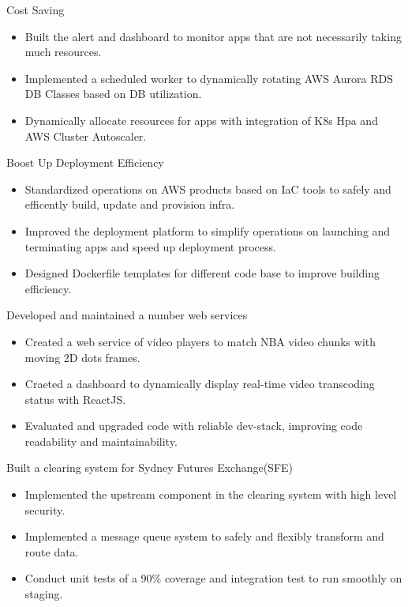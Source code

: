 \documentclass{resume}
\begin{document}
Cost Saving
\begin{itemize}
  \item Built the alert and dashboard to monitor apps that are not necessarily taking much resources.
  \item Implemented a scheduled worker to dynamically rotating AWS Aurora RDS DB Classes based on DB utilization.
  \item Dynamically allocate resources for apps with integration of K8s Hpa and AWS Cluster Autoscaler.
\end{itemize}

Boost Up Deployment Efficiency
\begin{itemize}
  \item Standardized operations on AWS products based on IaC tools to safely and efficently build, update and provision infra.
  \item Improved the deployment platform to simplify operations on launching and terminating apps and speed up deployment process.
  \item Designed Dockerfile templates for different code base to improve building efficiency.
\end{itemize}

Developed and maintained a number web services
\begin{itemize}
  \item Created a web service of video players to match NBA video chunks with moving 2D dots frames.
  \item Craeted a dashboard to dynamically display real-time video transcoding status with ReactJS.
  \item Evaluated and upgraded code with reliable dev-stack, improving code readability and maintainability.
\end{itemize}

Built a clearing system for Sydney Futures Exchange(SFE)
\begin{itemize}
  \item Implemented the upstream component in the clearing system with high level security.
  \item Implemented a message queue system to safely and flexibly transform and route data.
  \item Conduct unit tests of a 90\% coverage and integration test to run smoothly on staging.
\end{itemize}
\end{document}
